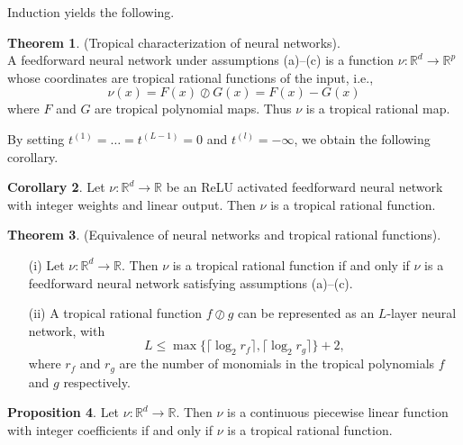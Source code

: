 \documentclass{article}
\theoremstyle{definition}
\newtheorem{theorem}{Theorem}[section]
\newtheorem{corollary}[theorem]{Corollary}
\newtheorem{proposition}[theorem]{Proposition}
\newtheorem{comment}[theorem]{Comment}
\begin{document}
Induction yields the following.

\begin{theorem}
(Tropical characterization of neural networks). \\
A feedforward neural network under assumptions (a)–(c)
is a function $\nu : \mathbb{R}^{d} \to \mathbb{R}^{p}$ whose coordinates are tropical rational functions of the input, i.e.,
$$ \nu(x) = F(x) \oslash G(x) = F(x) - G(x) $$
where $F$ and $G$ are tropical polynomial maps. Thus $\nu$ is a tropical rational map.
\end{theorem}

By setting $t^{(1)} = \dots = t^{(L-1)} = 0$ and $t^{(l)} = - \infty$, we obtain the following corollary.

\begin{corollary}
Let $\nu : \mathbb{R}^{d} \to \mathbb{R}$ be an ReLU activated feedforward neural network with integer weights and linear output. Then $\nu$ is a tropical rational function.
\end{corollary}

\begin{theorem}
(Equivalence of neural networks and tropical
rational functions).
\begin{itemize}
\item[(i)]
Let $\nu : \mathbb{R}^{d} \to \mathbb{R}$. Then $\nu$ is a tropical rational function if and only if $\nu$ is a feedforward neural network satisfying assumptions (a)–(c).
\item[(ii)]
A tropical rational function $f \oslash g$ can be represented as an $L$-layer neural network, with
$$ L \leq \max \{ \lceil \log_2 r_f \rceil, \lceil \log_2 r_g \rceil \} + 2,$$
where $r_f$ and $r_g$ are the number of monomials in the tropical polynomials $f$ and $g$ respectively.
\end{itemize}
\end{theorem}

\begin{proposition}
Let $\nu : \mathbb{R}^{d} \to \mathbb{R}$. Then $\nu$ is a continuous piecewise linear function with integer coefficients if and only if $\nu$ is a tropical rational function.
\end{proposition}
\end{document}
